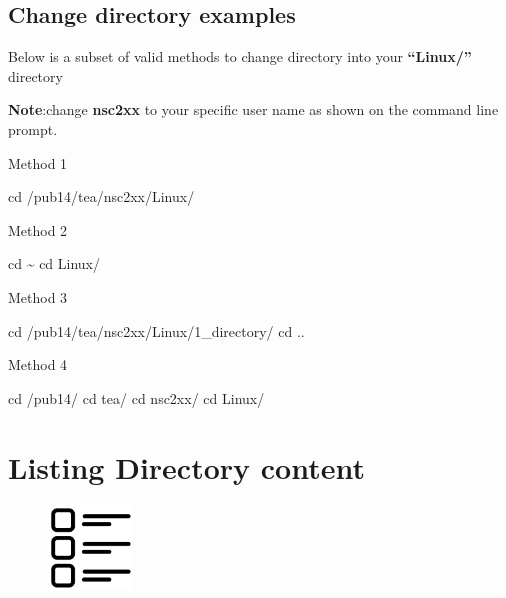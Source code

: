 \documentclass[
  letterpaper,
  DIV=11,
  numbers=noendperiod]{scrreprt}
\newenvironment{Shaded}{\begin{snugshade}}{\end{snugshade}}
\newcommand{\BuiltInTok}[1]{\textcolor[rgb]{0.00,0.23,0.31}{#1}}
\newcommand{\NormalTok}[1]{\textcolor[rgb]{0.00,0.23,0.31}{#1}}
\begin{document}
\hypertarget{change-directory-examples}{%
\subsection{Change directory examples}\label{change-directory-examples}}

Below is a subset of valid methods to change directory into your
\textbf{``Linux/''} directory

\textbf{Note}:change \textbf{nsc2xx} to your specific user name as shown
on the command line prompt.

Method 1

\begin{Shaded}
\begin{Highlighting}[]
\BuiltInTok{cd}\NormalTok{ /pub14/tea/nsc2xx/Linux/}
\end{Highlighting}
\end{Shaded}

Method 2

\begin{Shaded}
\begin{Highlighting}[]
\BuiltInTok{cd}\NormalTok{ \textasciitilde{}}
\BuiltInTok{cd}\NormalTok{ Linux/}
\end{Highlighting}
\end{Shaded}

Method 3

\begin{Shaded}
\begin{Highlighting}[]
\BuiltInTok{cd}\NormalTok{ /pub14/tea/nsc2xx/Linux/1\_directory/}
\BuiltInTok{cd}\NormalTok{ ..}
\end{Highlighting}
\end{Shaded}

Method 4

\begin{Shaded}
\begin{Highlighting}[]
\BuiltInTok{cd}\NormalTok{ /pub14/}
\BuiltInTok{cd}\NormalTok{ tea/}
\BuiltInTok{cd}\NormalTok{ nsc2xx/}
\BuiltInTok{cd}\NormalTok{ Linux/}
\end{Highlighting}
\end{Shaded}

\hypertarget{listing-directory-content}{%
\section{Listing Directory content}\label{listing-directory-content}}

\begin{figure}

{\centering \includegraphics[width=0.2\textwidth,height=\textheight]{figures/List.png}

}

\end{figure}
\end{document}
